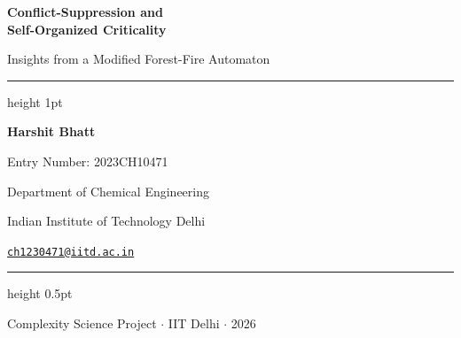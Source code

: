 \documentclass[12pt,a4paper]{article}
\begin{document}

\begin{titlepage}
  \pagecolor{navyblue}
  \color{white}
  \vspace*{3cm}
  \begin{center}
    {\huge\bfseries Conflict-Suppression and\\[6pt]
      Self-Organized Criticality\par}
    \vspace{10pt}
    {\large\color{lightblue}
      Insights from a Modified Forest-Fire Automaton\par}
    \vspace{30pt}
    {\color{accentblue!60!white}\hrule height 1pt}
    \vspace{20pt}
    {\large\bfseries Harshit Bhatt\par}
    \vspace{4pt}
    {\normalsize Entry Number: 2023CH10471\par}
    {\normalsize Department of Chemical Engineering\par}
    {\normalsize Indian Institute of Technology Delhi\par}
    \vspace{6pt}
    {\normalsize\texttt{\href{mailto:ch1230471@iitd.ac.in}{ch1230471@iitd.ac.in}}\par}
    \vspace{30pt}
    {\color{accentblue!60!white}\hrule height 0.5pt}
    \vspace{16pt}
    {\normalsize Complexity Science Project $\cdot$ IIT Delhi $\cdot$ 2026\par}
  \end{center}
  \vfill
\end{titlepage}
\pagecolor{white}\color{black}
\setcounter{page}{1}
\end{document}
